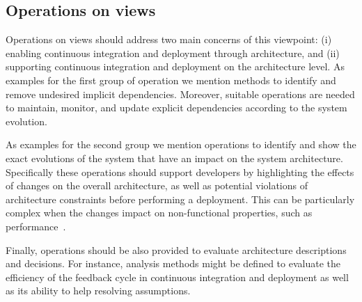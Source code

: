 


\subsection{Operations on views}\label{Opns}


Operations on views should address two main concerns of this viewpoint: (i) enabling continuous integration and deployment through architecture, and (ii) supporting continuous integration and deployment on the architecture level.
As examples for the first group of operation we mention methods to identify and remove undesired implicit dependencies. Moreover, suitable operations are needed to maintain, monitor, and update explicit dependencies according to the system evolution. 

As examples for the second group we mention operations to identify and show the exact evolutions of the system that have an impact on the system architecture. Specifically these operations should support developers by highlighting the effects of changes on the overall architecture, as well as potential violations of architecture constraints before performing a deployment. This can be particularly complex when the changes impact on non-functional properties, such as performance~\cite{ISSTA2016}. 

{Finally, operations should be also provided to evaluate architecture descriptions and decisions. For instance, analysis methods might be defined to evaluate the efficiency of the feedback cycle in continuous integration and deployment as well as its ability to help resolving assumptions.}


